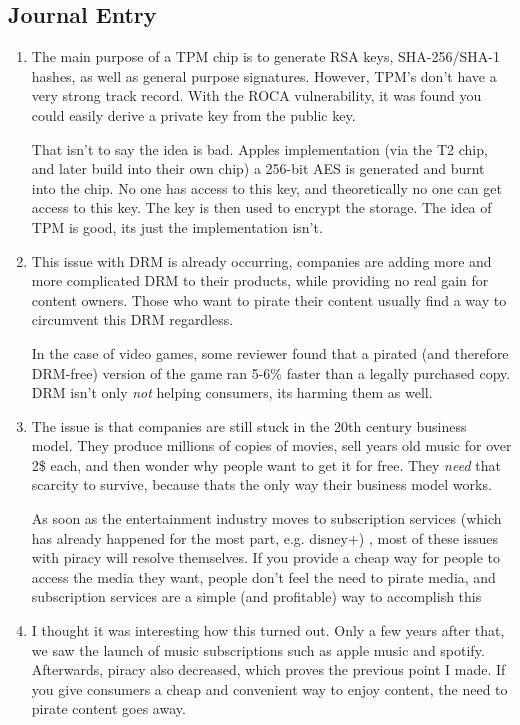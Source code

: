 \documentclass{scrartcl}
\begin{document}
\subsection{Journal Entry}
\label{sec:org53db8aa}
\begin{enumerate}
\item The main purpose of a TPM chip is to generate RSA keys, SHA-256/SHA-1 hashes,
as well as general purpose signatures. However, TPM's don't have a very
strong track record. With the ROCA vulnerability, it was found you could
easily derive a private key from the public key.

That isn't to say the idea is bad. Apples implementation (via the T2 chip,
and later build into their own chip) a 256-bit AES is generated and burnt
into the chip. No one has access to this key, and theoretically no one can
get access to this key. The key is then used to encrypt the storage. The idea
of TPM is good, its just the implementation isn't.

\item This issue with DRM is already occurring, companies are adding more and more
complicated DRM to their products, while providing no real gain for content
owners. Those who want to pirate their content usually find a way to
circumvent this DRM regardless.

In the case of video games, some reviewer
found that a pirated (and therefore DRM-free) version of the game ran 5-6\%
faster than a legally purchased copy. DRM isn't only \emph{not} helping consumers,
its harming them as well.

\item The issue is that companies are still stuck in the 20th century business
model. They produce millions of copies of movies, sell years old music for
over 2\$ each, and then wonder why people want to get it for free. They \emph{need}
that scarcity to survive, because thats the only way their business model
works.

As soon as the entertainment industry moves to subscription services
(which has already happened for the most part, e.g. disney+) , most of these
issues with piracy will resolve themselves. If you provide a cheap way for
people to access the media they want, people don't feel the need to pirate
media, and subscription services are a simple (and profitable) way to
accomplish this

\item I thought it was interesting how this turned out. Only a few years after
that, we saw the launch of music subscriptions such as apple music and
spotify. Afterwards, piracy also decreased, which proves the previous point I
made. If you give consumers a cheap and convenient way to enjoy content, the
need to pirate content goes away.
\end{enumerate}
\end{document}
